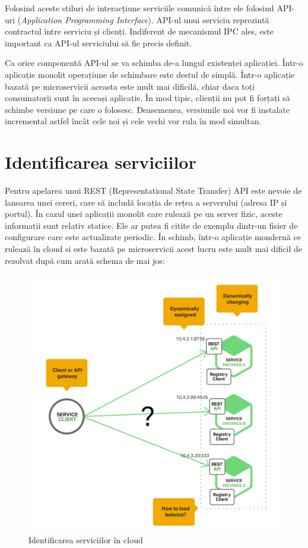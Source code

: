 \documentclass[12pt, a4paper, oneside, romanian]{teza-upb}
\begin{document}
Folosind aceste stiluri de interacțiune serviciile comunică între ele folosind API-uri (\textit{Application Programming Interface}). API-ul unui serviciu reprezintă contractul între serviciu și clienți. Indiferent de mecanismul IPC ales, este important ca API-ul serviciului să fie precis definit.

Ca orice componentă API-ul se va schimba de-a lungul existenței aplicației. Într-o aplicație monolit operațiune de schimbare este destul de simplă. Într-o aplicație bazată pe microservicii aceasta este mult mai dificilă, chiar daca toți consumatorii sunt în aceeași aplicație. În mod tipic, clienții nu pot fi forțați să schimbe versiune pe care o folosesc. Deasemenea, versiunile noi vor fi instalate incremental astfel încât cele noi și cele vechi vor rula în mod simultan. 
\newpage
\section{Identificarea serviciilor}

Pentru apelarea unui REST (Representational State Transfer) API este nevoie de lansarea unei cereri, care să includă locația de rețea a serverului (adresa IP și portul). În cazul unei aplicații monolit care rulează pe un server fizic, aceste informații sunt relativ statice. Ele ar putea fi citite de exemplu dintr-un fisier de configurare care este actualizate periodic. În schimb, într-o aplicație mondernă ce rulează în cloud si este bazată pe microservicii acest lucru este mult mai dificil de rezolvat după cum arată schema de mai jos:

\begin{figure}[ht]
\centering
\includegraphics[scale=0.3]{img/Richardson-microservices-part4-1_difficult-service-discovery.png}
\caption{Identificarea serviciilor în cloud}
\label{fig:arhi_componente}
\end{figure}
\end{document}
